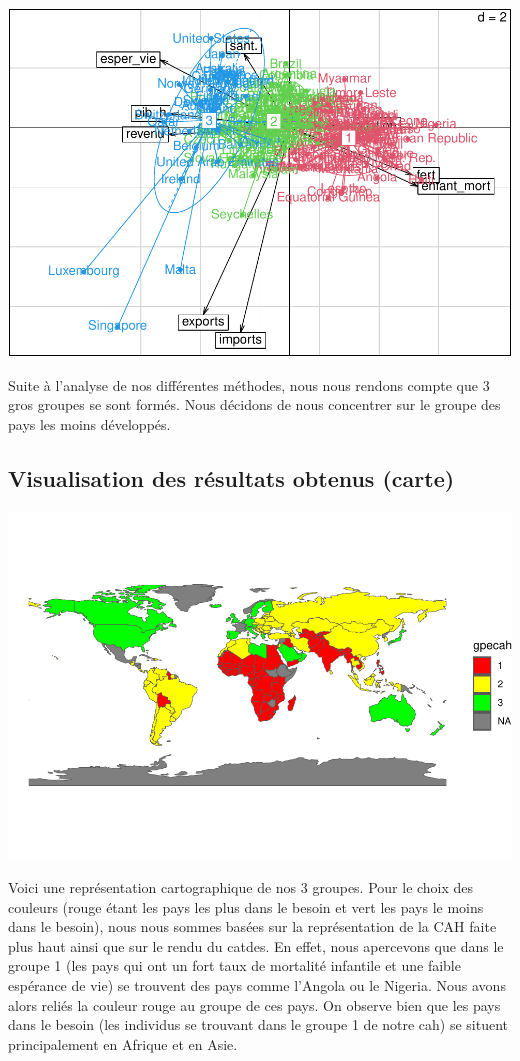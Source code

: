 \documentclass[
]{article}
\begin{document}
\includegraphics{Projet_files/figure-latex/unnamed-chunk-25-1.pdf}

Suite à l'analyse de nos différentes méthodes, nous nous rendons compte
que 3 gros groupes se sont formés. Nous décidons de nous concentrer sur
le groupe des pays les moins développés.

\hypertarget{visualisation-des-ruxe9sultats-obtenus-carte}{%
\subsection{Visualisation des résultats obtenus
(carte)}\label{visualisation-des-ruxe9sultats-obtenus-carte}}

\includegraphics{Projet_files/figure-latex/unnamed-chunk-26-1.pdf}

Voici une représentation cartographique de nos 3 groupes. Pour le choix
des couleurs (rouge étant les pays les plus dans le besoin et vert les
pays le moins dans le besoin), nous nous sommes basées sur la
représentation de la CAH faite plus haut ainsi que sur le rendu du
catdes. En effet, nous apercevons que dans le groupe 1 (les pays qui ont
un fort taux de mortalité infantile et une faible espérance de vie) se
trouvent des pays comme l'Angola ou le Nigeria. Nous avons alors reliés
la couleur rouge au groupe de ces pays. On observe bien que les pays
dans le besoin (les individus se trouvant dans le groupe 1 de notre cah)
se situent principalement en Afrique et en Asie.
\end{document}
